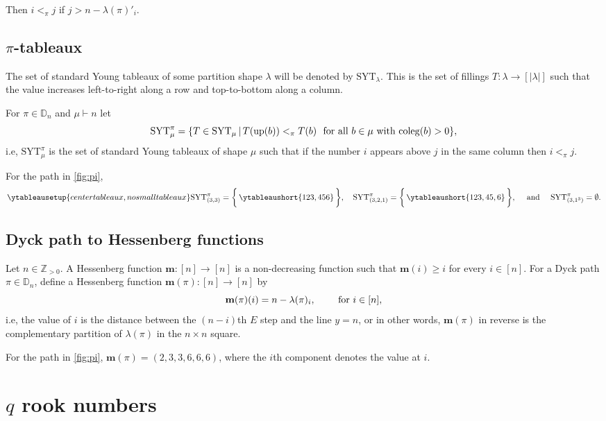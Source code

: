 \documentclass[12pt,reqno]{amsart}
\theoremstyle{plain}
\theoremstyle{definition}
\theoremstyle{remark}
\theoremstyle{example}
\numberwithin{equation}{section}
\newcommand\ZZ{\mathbb{Z}}
\newcommand\up{\mathrm{up}}
\newcommand{\coleg}{\mathrm{coleg}}
\newcommand{\SYT}{\mathrm{SYT}}
\newcommand{\DD}{\mathbb{D}}
\begin{document}
Then $i<_\pi j$ if $j > n - \lambda(\pi)'_i$.

\subsection{$\pi$-tableaux}
The set of standard Young tableaux of some partition shape $\lambda$ will be denoted by $\SYT_\lambda$. This is the set of fillings $T : \lambda \to [|\lambda|]$ such that the value increases left-to-right along a row and top-to-bottom along a column.

 For $\pi \in \DD_n$ and $\mu \vdash n$ let \begin{equation}
	\SYT_\mu^\pi = \{T \in \SYT_\mu\,|\, T(\up(b)) <_\pi T(b) \ \hbox{ for all } b \in \mu \hbox{ with } \coleg(b) >0 \},
\end{equation} i.e, $\SYT^\pi_\mu$ is the set of standard Young tableaux of shape $\mu$ such that if the number $i$ appears above $j$ in the same column then $i <_\pi j$.

For the path in \autoref{fig:pi}, \begin{equation}\label{eq:SYTpieg}
	\ytableausetup{centertableaux, nosmalltableaux} \SYT^\pi_{(3,3)} = \bigg\{\,\ytableaushort{123,456}\,\bigg\}, \quad \SYT^\pi_{(3,2,1)} =\bigg\{\,\ytableaushort{123,45,6}\,\bigg\}, \quad \hbox{ and } \quad \SYT^\pi_{(3,1^3)} = \emptyset.
\end{equation} 

\subsection{Dyck path to Hessenberg functions}\label{sec:DycktoHess}
Let $n \in \ZZ_{>0}$. A Hessenberg function $\mathbf{m}: [n] \to [n]$ is a non-decreasing function such that $\mathbf{m}(i) \geq i$ for every $i \in [n]$. For a Dyck path $\pi \in \DD_n$, define a Hessenberg function $\mathbf{m}(\pi) : [n] \to [n]$ by $$ \mathbf{m}(\pi)(i) = n-\lambda(\pi)_i, \qquad \hbox{ for } i \in [n],$$ i.e, the value of $i$ is the distance between the $(n-i)$th $E$ step and the line $y=n$, or in other words, $\mathbf{m}(\pi)$ in reverse is the complementary partition of $\lambda(\pi)$ in the $n\times n$ square. 

For the path in \autoref{fig:pi}, $\mathbf{m}(\pi) = (2,3,3,6,6,6)$, where the $i$th component denotes the value at $i$.

\section{$q$ rook numbers}
\end{document}
